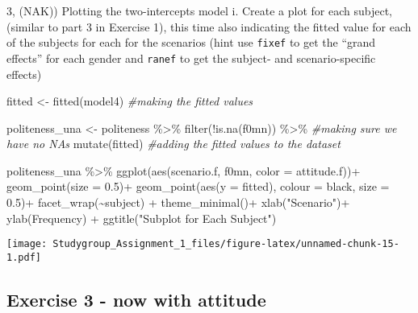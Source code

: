 \documentclass[
]{article}
\newenvironment{Shaded}{\begin{snugshade}}{\end{snugshade}}
\newcommand{\AttributeTok}[1]{\textcolor[rgb]{0.77,0.63,0.00}{#1}}
\newcommand{\CommentTok}[1]{\textcolor[rgb]{0.56,0.35,0.01}{\textit{#1}}}
\newcommand{\FloatTok}[1]{\textcolor[rgb]{0.00,0.00,0.81}{#1}}
\newcommand{\FunctionTok}[1]{\textcolor[rgb]{0.00,0.00,0.00}{#1}}
\newcommand{\NormalTok}[1]{#1}
\newcommand{\OtherTok}[1]{\textcolor[rgb]{0.56,0.35,0.01}{#1}}
\newcommand{\SpecialCharTok}[1]{\textcolor[rgb]{0.00,0.00,0.00}{#1}}
\newcommand{\StringTok}[1]{\textcolor[rgb]{0.31,0.60,0.02}{#1}}
\begin{document}
3, (NAK)) Plotting the two-intercepts model i. Create a plot for each
subject, (similar to part 3 in Exercise 1), this time also indicating
the fitted value for each of the subjects for each for the scenarios
(hint use \texttt{fixef} to get the ``grand effects'' for each gender
and \texttt{ranef} to get the subject- and scenario-specific effects)

\begin{Shaded}
\begin{Highlighting}[]
\NormalTok{fitted }\OtherTok{\textless{}{-}} \FunctionTok{fitted}\NormalTok{(model4) }\CommentTok{\#making the fitted values }

\NormalTok{politeness\_una }\OtherTok{\textless{}{-}}\NormalTok{ politeness }\SpecialCharTok{\%\textgreater{}\%} 
  \FunctionTok{filter}\NormalTok{(}\SpecialCharTok{!}\FunctionTok{is.na}\NormalTok{(f0mn)) }\SpecialCharTok{\%\textgreater{}\%}  \CommentTok{\#making sure we have no NA\textquotesingle{}s}
  \FunctionTok{mutate}\NormalTok{(fitted) }\CommentTok{\#adding the fitted values to the dataset }

\NormalTok{politeness\_una }\SpecialCharTok{\%\textgreater{}\%} 
  \FunctionTok{ggplot}\NormalTok{(}\FunctionTok{aes}\NormalTok{(scenario.f, f0mn, }\AttributeTok{color =}\NormalTok{ attitude.f))}\SpecialCharTok{+}
  \FunctionTok{geom\_point}\NormalTok{(}\AttributeTok{size =} \FloatTok{0.5}\NormalTok{)}\SpecialCharTok{+}
  \FunctionTok{geom\_point}\NormalTok{(}\FunctionTok{aes}\NormalTok{(}\AttributeTok{y =}\NormalTok{ fitted), }\AttributeTok{colour =} \StringTok{\textquotesingle{}black\textquotesingle{}}\NormalTok{, }\AttributeTok{size =} \FloatTok{0.5}\NormalTok{)}\SpecialCharTok{+}
  \FunctionTok{facet\_wrap}\NormalTok{(}\SpecialCharTok{\textasciitilde{}}\NormalTok{subject) }\SpecialCharTok{+}
  \FunctionTok{theme\_minimal}\NormalTok{()}\SpecialCharTok{+}
  \FunctionTok{xlab}\NormalTok{(}\StringTok{"Scenario"}\NormalTok{)}\SpecialCharTok{+}
  \FunctionTok{ylab}\NormalTok{(}\StringTok{\textquotesingle{}Frequency\textquotesingle{}}\NormalTok{) }\SpecialCharTok{+}
  \FunctionTok{ggtitle}\NormalTok{(}\StringTok{"Subplot for Each Subject"}\NormalTok{) }
\end{Highlighting}
\end{Shaded}

\texttt{[image: Studygroup\_Assignment\_1\_files/figure-latex/unnamed-chunk-15-1.pdf]}

\hypertarget{exercise-3---now-with-attitude}{%
\subsection{Exercise 3 - now with
attitude}\label{exercise-3---now-with-attitude}}
\end{document}
